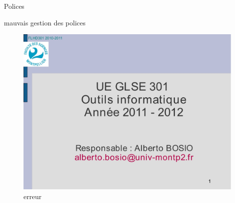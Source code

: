 \begin{frame}{Polices}
	\begin{block}{mauvais gestion des polices}
		\begin{figure}[h]
        		\begin{center}
         		\includegraphics[scale=0.17]{images/succes.jpg} 
        		\end{center}
        		\caption{erreur}
        		\label{erreur}
    		\end{figure}
	\end{block}
\end{frame}

%	

